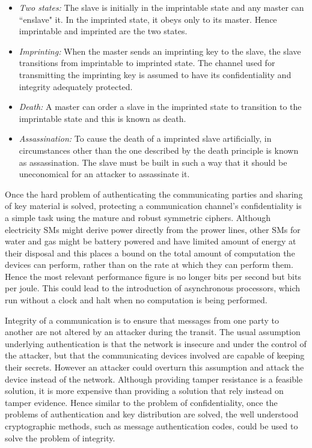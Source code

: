 \begin {itemize}
\item \emph{Two states:} The slave is initially in the imprintable state and any master can ``enslave" it. In the imprinted state, it obeys only to its master. Hence imprintable and imprinted are the two states.

\item \emph{Imprinting:} When the master sends an imprinting key to the slave, the slave transitions from imprintable to imprinted state. The channel used for transmitting the imprinting key is assumed to have its confidentiality and integrity adequately protected.

\item \emph{Death:} A master can order a slave in the imprinted state to transition to the imprintable state and this is known as death.

\item \emph{Assassination:} To cause the death of a imprinted slave artificially, in circumstances other than the one described by the death principle is known as assassination. The slave must be built in such a way that it should be uneconomical for an attacker to assassinate it.
\end {itemize}

Once the hard problem of authenticating the communicating parties and sharing of key material is solved, protecting a communication channel's confidentiality is a simple task using the mature and robust symmetric ciphers. Although electricity SMs might derive power directly from the prower lines, other SMs for water and gas might be battery powered and have limited amount of energy at their disposal and this places a bound on the total amount of computation the devices can perform, rather than on the rate at which they can perform them. Hence the most relevant performance figure is no longer bits per second but bits per joule. This could lead to the introduction of asynchronous processors, which run without a clock and halt when no computation is being performed.

Integrity of a communication is to ensure that messages from one party to another are not altered by an attacker during the transit. The usual assumption underlying authentication is that the network is insecure and under the control of the attacker, but that the communicating devices involved are capable of keeping their secrets. However an attacker could overturn this assumption and attack the device instead of the network. Although providing tamper resistance is a feasible solution, it is more expensive than providing a solution that rely instead on tamper evidence. Hence similar to the problem of confidentiality, once the problems of authentication and key distribution are solved, the well understood cryptographic methods, such as message authentication codes, could be used to solve the problem of integrity.

